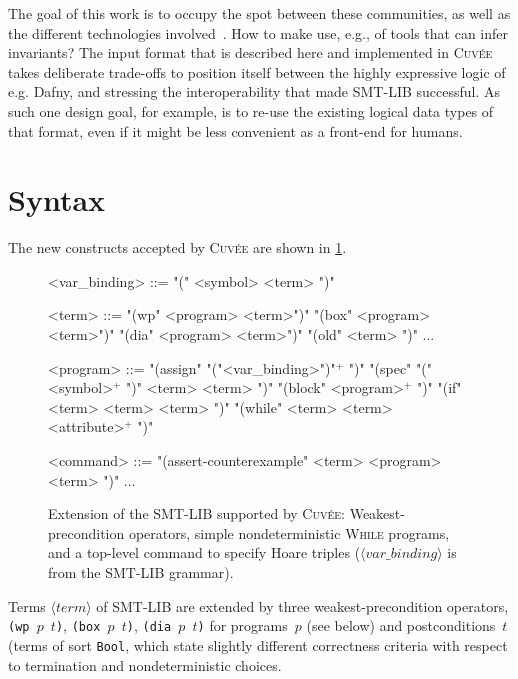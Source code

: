 \documentclass[fleqn]{llncs}
\newcommand{\Cuvee}{\textsc{Cuvée}\xspace}
\newcommand{\code}[1]{\texttt{#1}}
\newcommand{\nonterminal}[1]{\ensuremath{\langle \mathit{#1} \rangle}}
\begin{document}
The goal of this work is to occupy the spot between these communities,
as well as the different technologies involved~\cite{bartocci2019toolympics}.
How to make use, e.g., of tools that can infer invariants?
The input format that is described here and implemented in \Cuvee takes deliberate trade-offs
to position itself between the highly expressive logic of e.g. Dafny,
and stressing the interoperability that made SMT-LIB successful.
As such one design goal, for example, is to re-use the existing logical data types of that format,
even if it might be less convenient as a front-end for humans.

\section{Syntax}
\label{sec:syntax}

The new constructs accepted by \Cuvee are shown in \cref{fig:syntax}.

\begin{figure}[t]
    \begin{grammar}
    <var_binding>
        ::= "(" <symbol> <term> ")"

    <term>
        ::=  "(wp" <program> <term>")"
        \alt "(box" <program> <term>")"
        \alt "(dia" <program> <term>")"
        \alt "(old" <term> ")"
        \alt ...

    <program>
        ::=  "(assign" "("<var_binding>")"$^+$ ")"
        \alt "(spec"   "(" <symbol>$^+$ ")" <term> <term> ")"
        \alt "(block"  <program>$^+$ ")"
        \alt "(if"     <term> <term> <term> ")"
        \alt "(while"  <term> <term> <attribute>$^+$ ")"

    <command>
        ::=  "(assert-counterexample" <term> <program> <term> ")"
        \alt ...
    \end{grammar}
    \caption{Extension of the SMT-LIB supported by \Cuvee:
             Weakest-precondition operators,
             simple nondeterministic \textsc{While} programs,
             and a top-level command to specify Hoare triples
             (\nonterminal{var\_binding} is from the SMT-LIB grammar).}
    \label{fig:syntax}
\end{figure}

Terms \nonterminal{term} of SMT-LIB are extended by three weakest-precondition operators,
\code{(wp  $p$ $t$)}, \code{(box $p$ $t$)}, \code{(dia $p$ $t$)}
for programs~$p$ (see below)
and postconditions~$t$ (terms of sort \code{Bool},
which state slightly different correctness criteria with respect to termination and nondeterministic choices.
\end{document}

